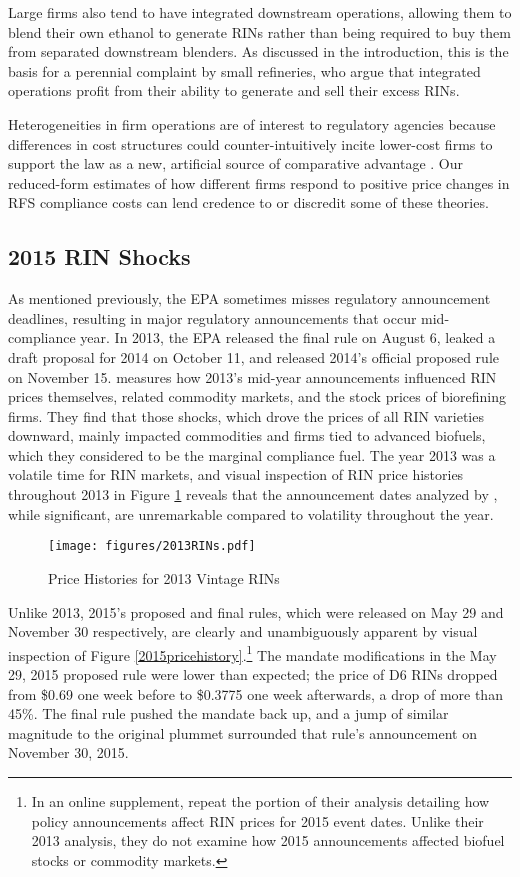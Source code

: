 \documentclass[11pt]{article}
\begin{document}
Large firms also tend to have integrated downstream operations, allowing them to blend their own ethanol to generate RINs rather than being required to buy them from separated downstream blenders. As discussed in the introduction, this is the basis for a perennial complaint by small refineries, who argue that integrated operations profit from their ability to generate and sell their excess RINs. 

Heterogeneities in firm operations are of interest to regulatory agencies because differences in cost structures could counter-intuitively incite lower-cost firms to support the law as a new, artificial source of comparative advantage \citep{Salop1983}. Our reduced-form estimates of how different firms respond to positive price changes in RFS compliance costs can lend credence to or discredit some of these theories.

\subsection{2015 RIN Shocks} \label{sec_2015shocks}

As mentioned previously, the EPA sometimes misses regulatory announcement deadlines, resulting in major regulatory announcements that occur mid-compliance year. In 2013, the EPA released the final rule on August 6, leaked a draft proposal for 2014 on October 11, and released 2014's official proposed rule on November 15. \cite{Lade2018a} measures how 2013's mid-year announcements influenced RIN prices themselves, related commodity markets, and the stock prices of biorefining firms.  They find that those shocks, which drove the prices of all RIN varieties downward, mainly impacted commodities and firms tied to advanced biofuels, which they considered to be the marginal compliance fuel. The year 2013 was a volatile time for RIN markets, and visual inspection of RIN price histories throughout 2013 in Figure \ref{2013pricehistory} reveals that the announcement dates analyzed by \cite{Lade2018a}, while significant, are unremarkable compared to volatility throughout the year.

\begin{figure}[h]
	\caption{Price Histories for 2013 Vintage RINs}
	\label{2013pricehistory}
	\texttt{[image: figures/2013RINs.pdf]}
\end{figure} 

Unlike 2013, 2015's proposed and final rules, which were released on May 29 and November 30 respectively, are clearly and unambiguously apparent by visual inspection of Figure \ref{2015pricehistory}.\footnote{In an online supplement, \cite{Lade2018a} repeat the portion of their analysis detailing how policy announcements affect RIN prices for 2015 event dates. Unlike their 2013 analysis, they do not examine how 2015 announcements affected biofuel stocks or commodity markets.} The mandate modifications in the May 29, 2015 proposed rule were lower than expected; the price of D6 RINs dropped from \$0.69 one week before to \$0.3775 one week afterwards, a drop of more than 45\%. The final rule pushed the mandate back up, and a jump of similar magnitude to the original plummet surrounded that rule's announcement on November 30, 2015. 
\end{document}
